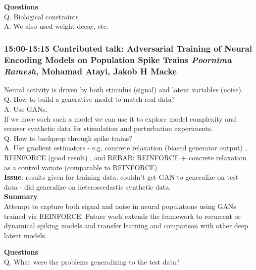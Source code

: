 \documentclass[12pt]{article}
\begin{document}
\textbf{Questions} \\

Q. Biological constraints \\

A. We also used weight decay, etc.


\subsubsection{15:00-15:15 Contributed talk: Adversarial Training of Neural Encoding Models on Population Spike Trains \textit{Poornima Ramesh}, Mohamad Atayi, Jakob H Macke}

Neural activity is driven by both stimulus (signal) and latent variables (noise). \\

Q. How to build a generative model to match real data? \\

A. Use GANs. \\

If we have such such a model we can use it to explore model complexity and recover synthetic data for stimulation and perturbation experiments. \\

Q. How to backprop through spike trains? \\

A. Use gradient estimators - e.g. concrete relaxation (biased generator output) \cite{Maddison16}, REINFORCE (good result) \cite{Williams1992}, and REBAR: REINFORCE + concrete relaxation as a control variate (comparable to REINFORCE). \\

\textbf{Issue}: results given for training data, couldn't get GAN to generalize on test data - did generalize on heteroscedastic synthetic data. \\

\textbf{Summary} \\
Attempt to capture both signal and noise in neural populations using GANs trained via REINFORCE. Future work extends the framework to recurrent or dynamical spiking models and transfer learning and comparison with other deep latent models.

\textbf{Questions} \\

Q. What were the problems generalizing to the test data? \\
\end{document}
